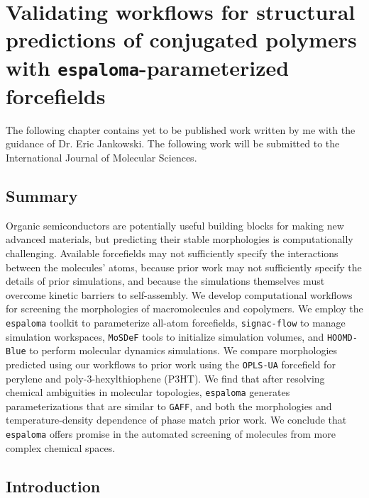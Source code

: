 \chapter{Validating workflows for structural predictions of conjugated polymers with \texttt{espaloma}-parameterized forcefields}
The following chapter contains yet to be published work written by me with the guidance of Dr. Eric Jankowski. The following work will be submitted to the International Journal of Molecular Sciences. 
\label{chap:EspVal}
\section{Summary} 
Organic semiconductors are potentially useful building blocks for making new advanced materials, but predicting their stable morphologies is computationally challenging. Available forcefields may not sufficiently specify the interactions between the molecules' atoms, because prior work may not sufficiently specify the details of prior simulations, and because the simulations themselves must overcome kinetic barriers to self-assembly. We develop computational workflows for screening the morphologies of macromolecules and copolymers. We employ the \texttt{espaloma} toolkit to parameterize all-atom forcefields, \texttt{signac-flow} to manage simulation workspaces, \texttt{MoSDeF} tools to initialize simulation volumes, and \texttt{HOOMD-Blue} to perform molecular dynamics simulations. We compare morphologies predicted using our workflows to prior work using the \texttt{OPLS-UA} forcefield for perylene and poly-3-hexylthiophene (P3HT). We find that after resolving chemical ambiguities in molecular topologies, \texttt{espaloma} generates parameterizations that are similar to \texttt{GAFF}, and both the morphologies and temperature-density dependence of phase match prior work. We conclude that \texttt{espaloma} offers promise in the automated screening of molecules from more complex chemical spaces.

\section{Introduction}

